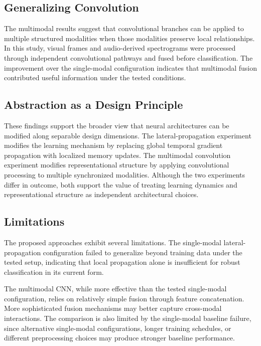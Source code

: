 \documentclass[lineno]{wlpeerj}
\begin{document}
\subsection{Generalizing Convolution}

The multimodal results suggest that convolutional branches can be applied to multiple structured modalities when those modalities preserve local relationships. In this study, visual frames and audio-derived spectrograms were processed through independent convolutional pathways and fused before classification. The improvement over the single-modal configuration indicates that multimodal fusion contributed useful information under the tested conditions.

\subsection{Abstraction as a Design Principle}

These findings support the broader view that neural architectures can be modified along separable design dimensions. The lateral-propagation experiment modifies the learning mechanism by replacing global temporal gradient propagation with localized memory updates. The multimodal convolution experiment modifies representational structure by applying convolutional processing to multiple synchronized modalities. Although the two experiments differ in outcome, both support the value of treating learning dynamics and representational structure as independent architectural choices.

\subsection{Limitations}

The proposed approaches exhibit several limitations. The single-modal lateral-propagation configuration failed to generalize beyond training data under the tested setup, indicating that local propagation alone is insufficient for robust classification in its current form.

The multimodal CNN, while more effective than the tested single-modal configuration, relies on relatively simple fusion through feature concatenation. More sophisticated fusion mechanisms may better capture cross-modal interactions. The comparison is also limited by the single-modal baseline failure, since alternative single-modal configurations, longer training schedules, or different preprocessing choices may produce stronger baseline performance.
\end{document}
